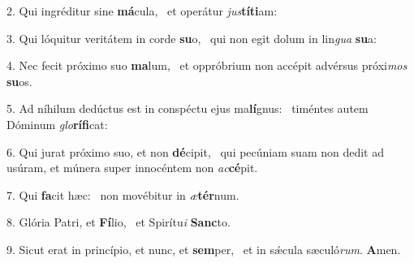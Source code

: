 2. Qui ingréditur sine \textbf{má}cula, \ast\  et operátur \textit{jus}\textbf{tí}\textbf{ti}am:\

3. Qui lóquitur veritátem in corde \textbf{su}o, \ast\  qui non egit dolum in lin\textit{gua} \textbf{su}a:\

4. Nec fecit próximo suo \textbf{ma}lum, \ast\  et oppróbrium non accépit advérsus próxi\textit{mos} \textbf{su}os.\

5. Ad níhilum dedúctus est in conspéctu ejus ma\textbf{lí}gnus: \ast\  timéntes autem Dóminum \textit{glo}\textbf{rí}\textbf{fi}cat:\

6. Qui jurat próximo suo, et non \textbf{dé}cipit, \ast\  qui pecúniam suam non dedit ad usúram, et múnera super innocéntem non \textit{ac}\textbf{cé}pit.\

7. Qui \textbf{fa}cit hæc: \ast\  non movébitur in \textit{æ}\textbf{tér}num.\

8. Glória Patri, et \textbf{Fí}lio, \ast\  et Spirítu\textit{i} \textbf{Sanc}to.\

9. Sicut erat in princípio, et nunc, et \textbf{sem}per, \ast\  et in sǽcula sæculó\textit{rum}. \textbf{A}men.\

